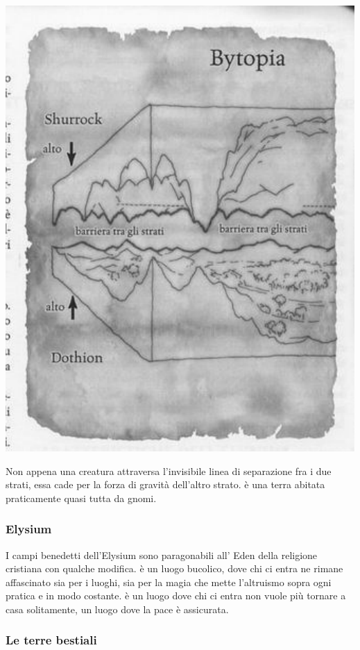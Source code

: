 \documentclass[a4paper,12pt]{book}
\begin{document}
\includegraphics{Bytopia.png}
\newpage

Non appena una creatura attraversa l'invisibile linea di separazione fra i due strati, essa cade per la forza di gravità dell'altro strato.
è una terra abitata praticamente quasi tutta da gnomi.

\subsubsection{Elysium}

I campi benedetti dell'Elysium sono paragonabili all' Eden della religione cristiana con qualche modifica.
è un luogo bucolico, dove chi ci entra ne rimane affascinato sia per i luoghi, sia per la magia che mette l'altruismo sopra ogni pratica e in modo costante.
è un luogo dove chi ci entra non vuole più tornare a casa solitamente, un luogo dove la pace è assicurata.

\subsubsection{Le terre bestiali}
\end{document}
